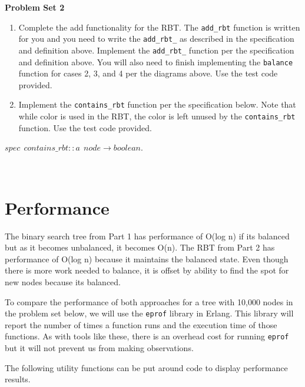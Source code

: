 \documentclass[
]{book}
\providecommand{\tightlist}{%
  \setlength{\itemsep}{0pt}\setlength{\parskip}{0pt}}
\begin{document}
\begin{problembox}
\textbf{Problem Set 2}

\begin{enumerate}
\def\labelenumi{\arabic{enumi}.}
\tightlist
\item
  Complete the add functionality for the RBT. The \texttt{add\_rbt} function is written for you and you need to write the \texttt{add\_rbt\_} as described in the specification and definition above. Implement the \texttt{add\_rbt\_} function per the specification and definition above. You will also need to finish implementing the \texttt{balance} function for cases 2, 3, and 4 per the diagrams above. Use the test code provided.
\item
  Implement the \texttt{contains\_rbt} function per the specification below. Note that while color is used in the RBT, the color is left unused by the \texttt{contains\_rbt} function. Use the test code provided.
\end{enumerate}

\begin{formulabox}
\(spec ~ ~ contains\_rbt :: a ~ ~ node \rightarrow boolean.\)

\end{formulabox}

\(\nonumber\)

\end{problembox}

\hypertarget{performance}{%
\section{Performance}\label{performance}}

The binary search tree from Part 1 has performance of O(log n) if its balanced but as it becomes unbalanced, it becomes O(n). The RBT from Part 2 has performance of O(log n) because it maintains the balanced state. Even though there is more work needed to balance, it is offset by ability to find the spot for new nodes because its balanced.

To compare the performance of both approaches for a tree with 10,000 nodes in the problem set below, we will use the \texttt{eprof} library in Erlang. This library will report the number of times a function runs and the execution time of those functions. As with tools like these, there is an overhead cost for running \texttt{eprof} but it will not prevent us from making observations.

The following utility functions can be put around code to display performance results.
\end{document}
